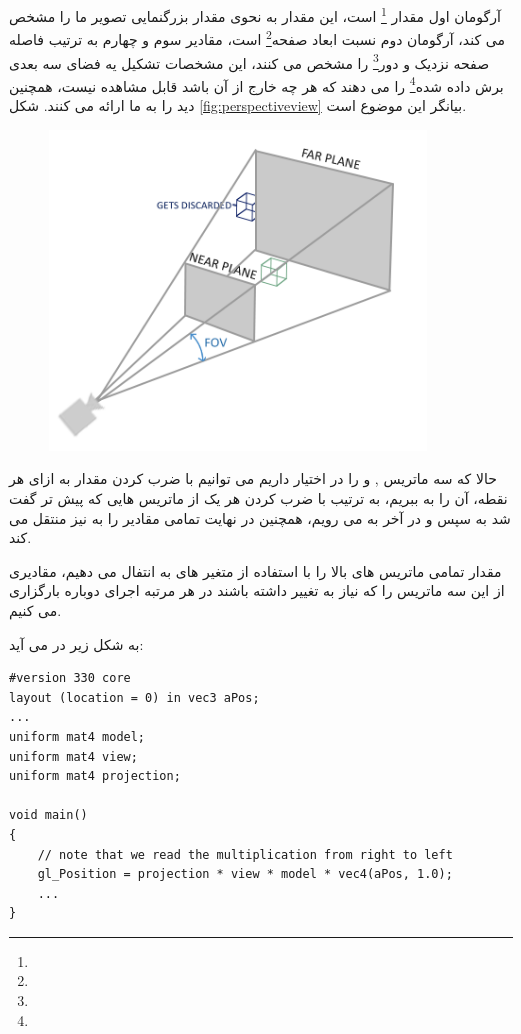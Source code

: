 \documentclass[a4paper, 12pt]{report}
\newcommand{\lrit}[1]{\lr{\textit{#1}}}
\begin{document}
    آرگومان اول مقدار \footnote{} است، این مقدار به نحوی مقدار بزرگنمایی تصویر ما را مشخص می کند، آرگومان دوم نسبت ابعاد صفحه\footnote{} است، مقادیر سوم و چهارم به ترتیب فاصله صفحه نزدیک و دور\footnote{} را مشخص می کنند، این مشخصات تشکیل یه فضای سه بعدی برش داده شده\footnote{} را می دهند که هر چه خارج از آن باشد قابل مشاهده نیست، همچنین دید  را به ما ارائه می کنند.
    شکل \ref{fig:perspectiveview} بیانگر این موضوع است.

\begin{figure}[ht]
    \centering
    \href{https://learnopengl.com}{
        \includegraphics[width=10cm]{images/perspective_frustum.png}
    }
    \caption{\fontsize{11pt}{1.0cm}\zarbold\textbf{}}
    \label{\lr{fig:perspectiveview}}
\end{figure}

    حالا که سه ماتریس ,  و  را در اختیار داریم می توانیم با ضرب کردن مقدار  به ازای هر نقطه، آن را به  ببریم، به ترتیب با ضرب کردن هر یک از ماتریس هایی که پیش تر گفت شد به  سپس  و در آخر به  می رویم، همچنین  در نهایت تمامی مقادیر را به  نیز منتقل می کند.\par
    مقدار تمامی ماتریس های بالا را با استفاده از متغیر های  به  انتفال می دهیم، مقادیری از این سه ماتریس را که نیاز به تغییر داشته باشند در هر مرتبه اجرای  دوباره بارگزاری می کنیم.\par
     به شکل زیر در می آید:
    \begin{LTR}
    \small
        \begin{lstlisting}[style=C++Style,caption=\lrit{going 3D}]
#version 330 core
layout (location = 0) in vec3 aPos;
...
uniform mat4 model;
uniform mat4 view;
uniform mat4 projection;

void main()
{
    // note that we read the multiplication from right to left
    gl_Position = projection * view * model * vec4(aPos, 1.0);
    ...
}
        \end{lstlisting}
    \end{LTR}
    \normalsize
    \vspace*{0.3cm}
\end{document}
